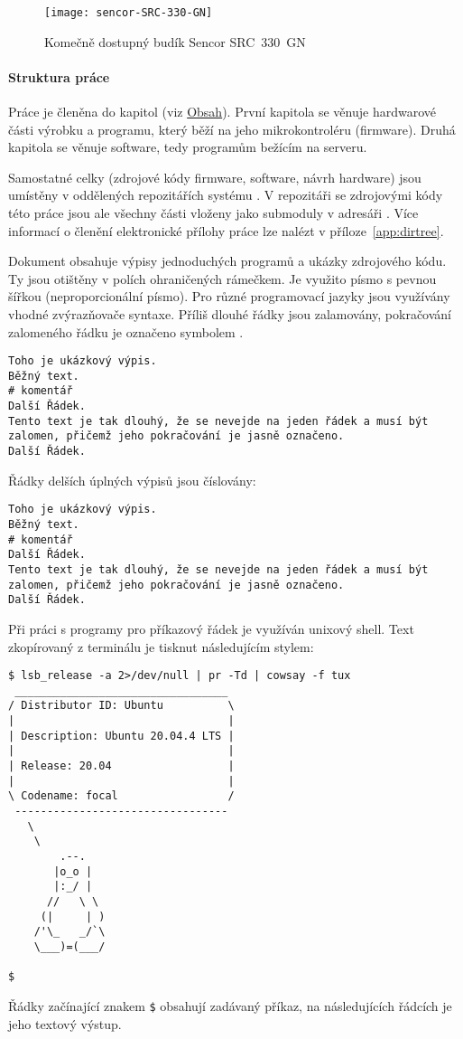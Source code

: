 \begin{figure}[htbp]
    \centering
    \texttt{[image: sencor-SRC-330-GN]}
    \caption{Komečně dostupný budík Sencor SRC~330~GN}
    \label{fig:sencor}
\end{figure}


\paragraph{Struktura práce}
Práce je členěna do kapitol (viz \hyperref[toc]{Obsah}). První kapitola se
věnuje hardwarové části výrobku a programu, který běží na jeho mikrokontroléru
(firmware). Druhá kapitola se věnuje software, tedy programům bežícím na
serveru.

Samostatné celky (zdrojové kódy firmware, software, návrh hardware) jsou
umístěny v oddělených repozitářích systému . V repozitáři se
zdrojovými kódy této práce jsou ale všechny části vloženy jako submoduly
v adresáři . Více informací o členění elektronické přílohy
práce lze nalézt v příloze~\vref{app:dirtree}.

Dokument obsahuje výpisy jednoduchých programů a ukázky zdrojového kódu.
Ty jsou otištěny v polích ohraničených rámečkem. Je využito písmo s pevnou
šířkou (neproporcionální písmo). Pro různé programovací jazyky jsou využívány
vhodné zvýrazňovače syntaxe. Příliš dlouhé řádky jsou zalamovány, pokračování
zalomeného řádku je označeno symbolem \lstpostbreak{}.

\begin{lstlisting}[language=hashcomment]
Toho je ukázkový výpis.
Běžný text.
# komentář
Další Řádek.
Tento text je tak dlouhý, že se nevejde na jeden řádek a musí být zalomen, přičemž jeho pokračování je jasně označeno.
Další Řádek.
\end{lstlisting}

Řádky delších úplných výpisů jsou číslovány:
\begin{lstlisting}[language=hashcomment,style=numbers]
Toho je ukázkový výpis.
Běžný text.
# komentář
Další Řádek.
Tento text je tak dlouhý, že se nevejde na jeden řádek a musí být zalomen, přičemž jeho pokračování je jasně označeno.
Další Řádek.
\end{lstlisting}

Při práci s programy pro příkazový řádek je využíván unixový shell.
Text zkopírovaný z terminálu je tisknut následujícím stylem:
\begin{lstlisting}[style=terminal]
$ lsb_release -a 2>/dev/null | pr -Td | cowsay -f tux
 _________________________________
/ Distributor ID: Ubuntu          \
|                                 |
| Description: Ubuntu 20.04.4 LTS |
|                                 |
| Release: 20.04                  |
|                                 |
\ Codename: focal                 /
 ---------------------------------
   \
    \
        .--.
       |o_o |
       |:_/ |
      //   \ \
     (|     | )
    /'\_   _/`\
    \___)=(___/

$
\end{lstlisting}
Řádky začínající znakem \texttt{\$} obsahují zadávaný příkaz, na následujících
řádcích je jeho textový výstup.
